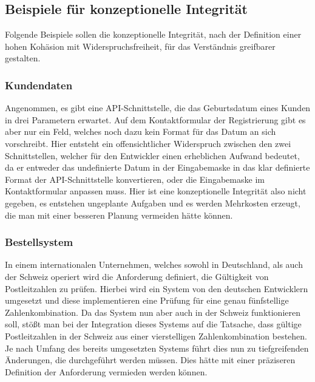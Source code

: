 \documentclass[a4paper, ngerman, 12pt, usenames, dvipsnames]{article}
\begin{document}
\subsection{Beispiele für konzeptionelle Integrität}
Folgende Beispiele sollen die konzeptionelle Integrität, nach der Definition einer hohen Kohäsion mit Widerspruchsfreiheit, für das Verständnis greifbarer gestalten.

\subsubsection{Kundendaten}
Angenommen, es gibt eine API-Schnittstelle, die das Geburtsdatum eines Kunden in drei Parametern erwartet. Auf dem Kontaktformular der Registrierung gibt es aber nur ein Feld, welches noch dazu kein Format für das Datum an sich vorschreibt. Hier entsteht ein offensichtlicher Widerspruch zwischen den zwei Schnittstellen, welcher für den Entwickler einen erheblichen Aufwand bedeutet, da er entweder das undefinierte Datum in der Eingabemaske in das klar definierte Format der API-Schnittstelle konvertieren, oder die Eingabemaske im Kontaktformular anpassen muss. Hier ist eine konzeptionelle Integrität also nicht gegeben, es entstehen ungeplante Aufgaben und es werden Mehrkosten erzeugt, die man mit einer besseren Planung vermeiden hätte können.

\subsubsection{Bestellsystem}
In einem internationalen Unternehmen, welches sowohl in Deutschland, als auch der Schweiz operiert wird die Anforderung definiert, die Gültigkeit von Postleitzahlen zu prüfen. Hierbei wird ein System von den deutschen Entwicklern umgesetzt und diese implementieren eine Prüfung für eine genau fünfstellige Zahlenkombination. Da das System nun aber auch in der Schweiz funktionieren soll, stößt man bei der Integration dieses Systems auf die Tatsache, dass gültige Postleitzahlen in der Schweiz aus einer vierstelligen Zahlenkombination bestehen. Je nach Umfang des bereits umgesetzten Systems führt dies nun zu tiefgreifenden Änderungen, die durchgeführt werden müssen. Dies hätte mit einer präziseren Definition der Anforderung vermieden werden können.
\end{document}
